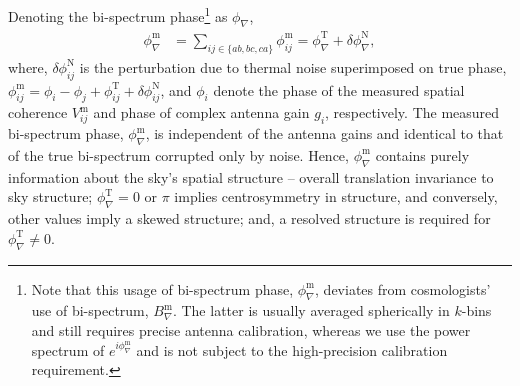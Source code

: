 \documentclass[
reprint,
superscriptaddress,
amsmath,
amssymb,
aps,
prd
]{revtex4-1}
\begin{document}

Denoting the bi-spectrum phase\footnote{Note that this usage of bi-spectrum phase, $\phi_\nabla^\textrm{m}$, deviates from cosmologists' use of bi-spectrum, $B_\nabla^\textrm{m}$. The latter is usually averaged spherically in $k$-bins and still requires precise antenna calibration, whereas we use the power spectrum of $e^{i\phi_\nabla^\textrm{m}}$ and is not subject to the high-precision calibration requirement.} as $\phi_\nabla$, 
\begin{align}
  \phi_\nabla^\textrm{m} &= \sum_{ij\in{\{ab,bc,ca\}}}\phi_{ij}^\textrm{m} = \phi_\nabla^\textrm{T} + \delta\phi_\nabla^\textrm{N} \label{eqn:cpphase-sum},
\end{align}
where, $\delta\phi_{ij}^\textrm{N}$ is the perturbation due to thermal noise superimposed on true phase, $\phi_{ij}^\textrm{m} = \phi_i - \phi_j + \phi_{ij}^\textrm{T} + \delta\phi_{ij}^\textrm{N}$, and $\phi_i$ denote the phase of the measured spatial coherence $V_{ij}^\textrm{m}$ and phase of complex antenna gain $g_i$, respectively. The measured bi-spectrum phase, $\phi_\nabla^\textrm{m}$, is independent of the antenna gains and identical to that of the true bi-spectrum corrupted only by noise. Hence, $\phi_\nabla^\textrm{m}$ contains purely information about the sky's spatial structure\cite{mon07} -- overall translation invariance to sky structure; $\phi_\nabla^\textrm{T}=0$ or $\pi$ implies centrosymmetry in structure, and conversely, other values imply a skewed structure; and, a resolved structure is required for $\phi_\nabla^\textrm{T}\ne 0$.
\end{document}

